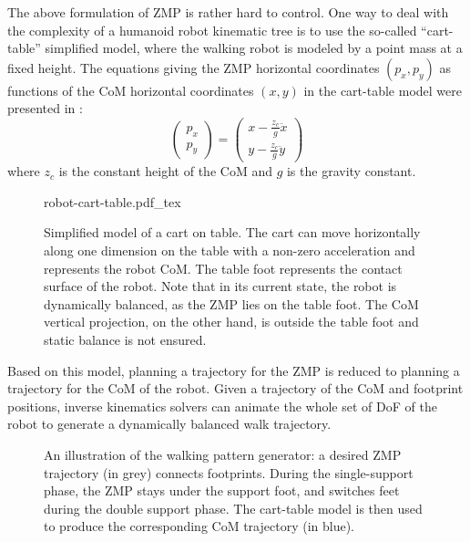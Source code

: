 The above formulation of ZMP is rather hard to control.  One way to
deal with the complexity of a humanoid robot kinematic tree is to use
the so-called ``cart-table'' simplified model, where the walking robot
is modeled by a point mass at a fixed height.  The equations giving
the ZMP horizontal coordinates $(p_x,p_y)$ as functions of the CoM
horizontal coordinates $(x,y)$ in the cart-table model were presented
in \cite{kaji03}:
\begin{equation}
\label{eq:chap1-walk-zmp}
\left(
\begin{array}{c}
p_x\\ p_y
\end{array}
\right) = \displaystyle \left(
\begin{array}{c}
x - \frac{z_c}{g} \ddot{x}\\ y - \frac{z_c}{g} \ddot{y}
\end{array}
\right)
\end{equation}
where $z_c$ is the constant height of the CoM and $g$ is the gravity
constant.

\begin{figure}
  \centering
      {\def\svgwidth{0.5\linewidth}
        
                   {robot-cart-table.pdf_tex}}
      \caption{Simplified model of a cart on table. The cart can move
        horizontally along one dimension on the table with a non-zero
        acceleration and represents the robot CoM. The table foot
        represents the contact surface of the robot. Note that in its
        current state, the robot is dynamically balanced, as the ZMP
        lies on the table foot. The CoM vertical projection, on the
        other hand, is outside the table foot and static balance is
        not ensured.}
      \label{fig:chap1-robot-cart-table}
\end{figure}

Based on this model, planning a trajectory for the ZMP is reduced to
planning a trajectory for the CoM of the robot. Given a trajectory of
the CoM and footprint positions, inverse kinematics solvers can
animate the whole set of DoF of the robot to generate a dynamically
balanced walk trajectory.

\begin{figure}
  \centering
  
  \caption{An illustration of the walking pattern generator: a desired
    ZMP trajectory (in grey) connects footprints. During the
    single-support phase, the ZMP stays under the support foot, and
    switches feet during the double support phase. The cart-table
    model is then used to produce the corresponding CoM trajectory (in
    blue).}
  \label{fig:chap1-zmp}
\end{figure}

